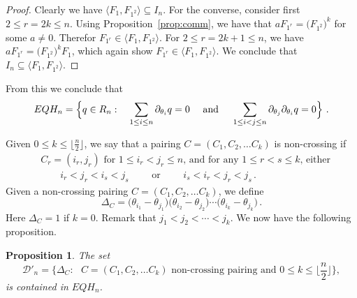 \documentclass[11pt]{amsart}
\newtheorem{prop}[theorem]{Proposition}
\theoremstyle{definition}
\numberwithin{equation}{section}
\begin{document}
\begin{proof} Clearly we have $ \langle F_1, F_{1^2}  \rangle \subseteq I_n$. For the  converse, consider first $2\le r=2k\le n$. Using Proposition~\ref{prop:comm}, we have that
$aF_{1^r} = \big(F_{1^2}\big)^k$ for some $a\ne 0$. Therefor $F_{1^r} \in \langle F_1, F_{1^2}  \rangle$. For $2\le r=2k+1\le n$, we have $aF_{1^r} = \big(F_{1^2}\big)^kF_1$, which again show $F_{1^r} \in \langle F_1, F_{1^2}  \rangle$. We conclude that $I_n\subseteq  \langle F_1, F_{1^2}  \rangle$. 
\end{proof}
From this we conclude that 
\begin{equation}\label{eq:defEQH}
EQH_n =  \Big\{ q \in R_n :  \quad\sum_{1\le i\le n} \partial_{\theta_i}q= 0 \quad\hbox{ and  }\quad \sum_{1\le i<j\le n} \partial_{\theta_j}\partial_{\theta_i}q= 0 \Big\}~.
\end{equation}

Given $0\le k\le \lfloor \frac{n}{2}\rfloor$, we say that a pairing $C=(C_1,C_2,\ldots C_k)$ is non-crossing if
\begin{align*}
 &C_r=(i_r,j_r) \text{ for $1\le i_r<j_r\le n$,}\text{ and for any $1\le r<s\le k$, either}\\	
 &\qquad i_r<j_r<i_s<j_s \qquad \text{ or }\qquad  i_s<i_r<j_r<j_s\,. 
\end{align*}
Given a non-crossing pairing $C=(C_1,C_2,\ldots C_k)$, we define
  $$\Delta_C = \big(\theta_{i_1}-\theta_{j_1}\big)\big(\theta_{i_2}-\theta_{j_2}\big)\cdots \big(\theta_{i_k}-\theta_{j_k}\big)\,.
  $$
Here $\Delta_C=1$ if $k=0$. Remark that $j_1<j_2<\cdots< j_k$. We now have the following proposition.

\begin{prop}\label{harmbasis}
The set
$${\mathcal D}'_n =\big\{ \Delta_C: \text{ $C=(C_1,C_2,\ldots C_k)$  non-crossing pairing and $0\le k\le \lfloor \frac{n}{2}\rfloor$}\big\},
$$
is contained in $EQH_n $.
\end{prop}
\end{document}
